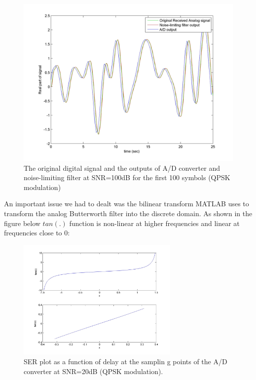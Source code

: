 \documentclass[]{article}
\begin{document}
\begin{figure}[H]
\centering
\includegraphics[width=\textwidth]{AtoD.jpg}
\caption{The original digital signal and the outputs of A/D converter and noise-limiting filter at SNR=100dB for the first 100 symbols (QPSK modulation) \label{fig:atod}}
\end{figure}

\newpage
An important issue we had to dealt was the bilinear transform MATLAB uses to transform the analog Butterworth filter into the discrete domain. As shown in the figure below $tan(.)$ function is non-linear at higher frequencies and linear at frequencies close to 0:

\begin{figure}[H]
\centering
\hspace*{-2cm}\includegraphics[width=0.7\textwidth]{tan_graph.jpg}
\caption{SER plot as a function of delay at the samplin g points of the A/D converter at SNR=20dB (QPSK modulation). \label{fig:delay}}
\end{figure} 
\end{document}
